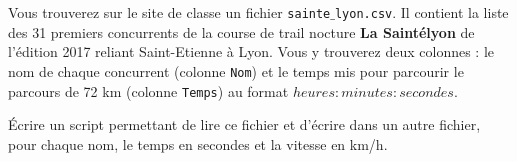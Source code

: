 Vous trouverez sur le site de classe un fichier \texttt{sainte$\_$lyon.csv}.
Il contient la liste des 31 premiers concurrents de la course de trail nocture \textbf{La Saintélyon} de l'édition 2017 reliant Saint-Etienne à Lyon. 
Vous y trouverez deux colonnes : le nom de chaque concurrent (colonne \texttt{Nom}) et le temps mis pour parcourir le parcours de 72 km (colonne \texttt{Temps}) au format $heures:minutes:secondes$. 

Écrire un script \python{} permettant de lire ce fichier et d'écrire dans un autre fichier, pour chaque nom, le temps en secondes et la vitesse en km/h. 

